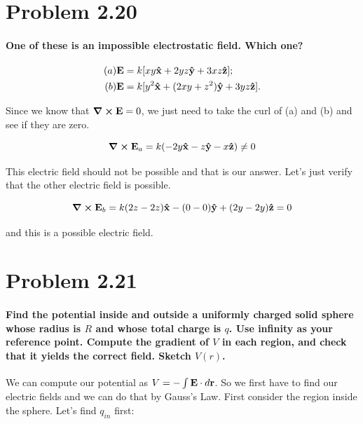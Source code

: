 \documentclass{article}
\numberwithin{equation}{section}
\numberwithin{figure}{section}
\newcommand{\vbh}[1]{\vb{\hat{#1}}}
\begin{document}
\section{Problem 2.20}

\paragraph{One of these is an impossible electrostatic field. Which one?}

\begin{equation*}
    \begin{split}
        (a) \vb{E} &= k [xy \vbh x + 2 yz \vbh y + 3xz \vbh z]; \\
        (b) \vb E &= k [y^2 \vbh x + (2xy + z^2) \vbh y + 3yz \vbh z].
    \end{split}
\end{equation*}

Since we know that $\curl \vb E = 0$, we just need to take the curl of (a) and (b) and see if they are zero.

\begin{equation}
    \curl \vb E_a = k ( -2y \vbh x - z \vbh y - x \vbh z) \not = 0
\end{equation}

This electric field should not be possible and that is our answer. Let's just verify that the other electric field is possible.

\begin{equation}
    \curl \vb E_b = k (2z - 2z) \vbh x - (0 - 0 ) \vbh y + ( 2y - 2y) \vbh z = 0
\end{equation}

and this is a possible electric field.

\section{Problem 2.21}

\paragraph{Find the potential inside and outside a uniformly charged solid sphere whose radius is $R$ and whose total charge is $q$. Use infinity as your reference point. Compute the gradient of $V$ in each region, and check that it yields the correct field. Sketch $V (r)$. \\}

We can compute our potential as $V = - \int \vb E \cdot d \vb r$. So we first have to find our electric fields and we can do that by Gauss's Law. First consider the region inside the sphere. Let's find $q_{in}$ first:
\end{document}
